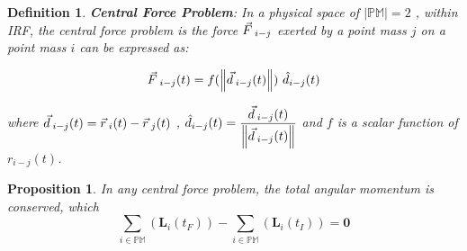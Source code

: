 \documentclass[12pt]{amsart}
\newtheorem{definition}[theorem]{Definition}
\newtheorem{proposition}[theorem]{Proposition}
\let\oldvec\vec
\renewcommand{\vec}[1]{\oldvec{#1}\hspace{0.1em}}
\begin{document}
\begin{definition}
\textbf{Central Force Problem}: In a physical space of $\left | \mathbb{PM} \right | = 2$ , within IRF, the central force problem is the force $\vec{F}_{i-j}$ exerted by a point mass $j$ on a point mass $i$ can be expressed as:

$$ \vec{F}_{i-j}(t) = f(\left \|\vec{d}_{i-j} (t)\right \|)\ \hat{d}_{i-j} (t) $$

where $\vec{d}_{i-j} (t) = \vec{r}_{i} (t)- \vec{r}_{j} (t)$ , $\hat{d}_{i-j} (t) = \dfrac{\vec{d}_{i-j} (t)}{\left \| \vec{d}_{i-j} (t) \right \|}$ and $f$ is a scalar function of $r_{i-j}(t)$.
\end{definition}

\begin{proposition}
    In any central force problem, the total angular momentum is conserved, which
    $$ \sum_{i \in \mathbb{PM}} \left( \boldsymbol{L}_{i}(t_F) \right)- \sum_{i \in \mathbb{PM}} \left( \boldsymbol{L}_{i}(t_I) \right) = \boldsymbol{0} $$
\end{proposition}
\end{document}
